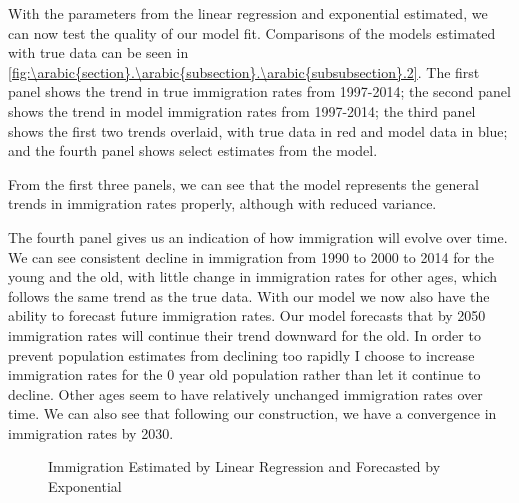 \documentclass[10pt]{article}
\renewcommand{\thesection}{\arabic{section}}
\renewcommand{\thesubsection}{\thesection.\arabic{subsection}}
\renewcommand{\thesubsubsection}{\thesubsection.\arabic{subsubsection}}
\numberwithin{equation}{subsection}
\newcommand*{\FigureDir}{../../graphs}
\begin{document}
\par With the parameters from the linear regression and exponential estimated, we can now test the quality of our model fit. Comparisons of the models estimated with true data can be seen in \autoref{fig:\thesubsubsection.2}. The first panel shows the trend in true immigration rates from 1997-2014; the second panel shows the trend in model immigration rates from 1997-2014; the third panel shows the first two trends overlaid, with true data in red and model data in blue; and the fourth panel shows select estimates from the model.

\par From the first three panels, we can see that the model represents the general trends in immigration rates properly, although with reduced variance. 

\par The fourth panel gives us an indication of how immigration will evolve over time. We can see consistent decline in immigration from 1990 to 2000 to 2014 for the young and the old, with little change in immigration rates for other ages, which follows the same trend as the true data. With our model we now also have the ability to forecast future immigration rates. Our model forecasts that by 2050 immigration rates will continue their trend downward for the old. In order to prevent population estimates from declining too rapidly I choose to increase immigration rates for the 0 year old population rather than let it continue to decline. Other ages seem to have relatively unchanged immigration rates over time. We can also see that following our construction, we have a convergence in immigration rates by 2030.

\begin{figure}[!ht]
   \centering
   \caption{\label{fig:\thesubsubsection.2}Immigration Estimated by Linear Regression and Forecasted by Exponential}
\end{figure}
\end{document}

